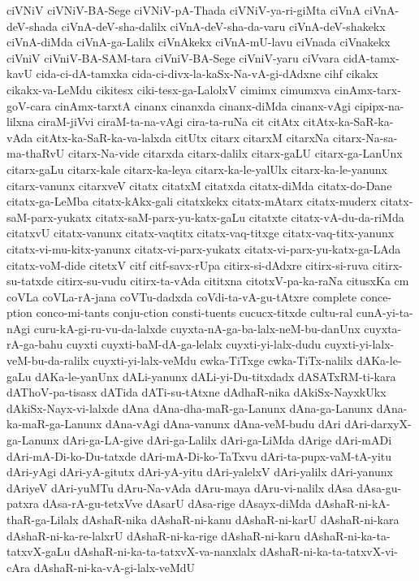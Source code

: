{ciVNiV
ciVNiV-BA-Sege
ciVNiV-pA-Thada
ciVNiV-ya-ri-giMta
ciVnA
ciVnA-deV-shada
ciVnA-deV-sha-dalilx
ciVnA-deV-sha-da-varu
ciVnA-deV-shakekx
ciVnA-diMda
ciVnA-ga-Lalilx
ciVnAkekx
ciVnA-mU-lavu
ciVnada
ciVnakekx
ciVniV
ciVniV-BA-SAM-tara
ciVniV-BA-Sege
ciVniV-yaru
ciVvara
cidA-tamx-kavU
cida-ci-dA-tamxka
cida-ci-divx-la-kaSx-Na-vA-gi-dAdxne
cihf
cikakx
cikakx-va-LeMdu
cikitesx
ciki-tesx-ga-LalolxV
cimimx
cimumxva
cinAmx-tarx-goV-cara
cinAmx-tarxtA
cinanx
cinanxda
cinanx-diMda
cinanx-vAgi
cipipx-na-lilxna
ciraM-jiVvi
ciraM-ta-na-vAgi
cira-ta-ruNa
cit
citAtx
citAtx-ka-SaR-ka-vAda
citAtx-ka-SaR-ka-va-lalxda
citUtx
citarx
citarxM
citarxNa
citarx-Na-sa-ma-thaRvU
citarx-Na-vide
citarxda
citarx-dalilx
citarx-gaLU
citarx-ga-LanUnx
citarx-gaLu
citarx-kale
citarx-ka-leya
citarx-ka-le-yalUlx
citarx-ka-le-yanunx
citarx-vanunx
citarxveV
citatx
citatxM
citatxda
citatx-diMda
citatx-do-Dane
citatx-ga-LeMba
citatx-kAkx-gali
citatxkekx
citatx-mAtarx
citatx-muderx
citatx-saM-parx-yukatx
citatx-saM-parx-yu-katx-gaLu
citatxte
citatx-vA-du-da-riMda
citatxvU
citatx-vanunx
citatx-vaqtitx
citatx-vaq-titxge
citatx-vaq-titx-yanunx
citatx-vi-mu-kitx-yanunx
citatx-vi-parx-yukatx
citatx-vi-parx-yu-katx-ga-LAda
citatx-voM-dide
citetxV
citf
citf-savx-rUpa
citirx-si-dAdxre
citirx-si-ruva
citirx-su-tatxde
citirx-su-vudu
citirx-ta-vAda
cititxna
citotxV-pa-ka-raNa
citusxKa
cm
coVLa
coVLa-rA-jana
coVTu-dadxda
coVdi-ta-vA-gu-tAtxre
complete
conce-ption
conco-mi-tants
conju-ction
consti-tuents
cucucx-titxde
cultu-ral
cunA-yi-ta-nAgi
curu-kA-gi-ru-vu-da-lalxde
cuyxta-nA-ga-ba-lalx-neM-bu-danUnx
cuyxta-rA-ga-bahu
cuyxti
cuyxti-baM-dA-ga-lelalx
cuyxti-yi-lalx-dudu
cuyxti-yi-lalx-veM-bu-da-ralilx
cuyxti-yi-lalx-veMdu
cwka-TiTxge
cwka-TiTx-nalilx
dAKa-le-gaLu
dAKa-le-yanUnx
dALi-yanunx
dALi-yi-Du-titxdadx
dASATxRM-ti-kara
dAThoV-pa-tisasx
dATida
dATi-su-tAtxne
dAdhaR-nika
dAkiSx-NayxkUkx
dAkiSx-Nayx-vi-lalxde
dAna
dAna-dha-maR-ga-Lanunx
dAna-ga-Lanunx
dAna-ka-maR-ga-Lanunx
dAna-vAgi
dAna-vanunx
dAna-veM-budu
dAri
dAri-darxyX-ga-Lanunx
dAri-ga-LA-give
dAri-ga-Lalilx
dAri-ga-LiMda
dArige
dAri-mADi
dAri-mA-Di-ko-Du-tatxde
dAri-mA-Di-ko-TaTxvu
dAri-ta-pupx-vaM-tA-yitu
dAri-yAgi
dAri-yA-gitutx
dAri-yA-yitu
dAri-yalelxV
dAri-yalilx
dAri-yanunx
dAriyeV
dAri-yuMTu
dAru-Na-vAda
dAru-maya
dAru-vi-nalilx
dAsa
dAsa-gu-patxra
dAsa-rA-gu-tetxVve
dAsarU
dAsa-rige
dAsayx-diMda
dAshaR-ni-kA-thaR-ga-Lilalx
dAshaR-nika
dAshaR-ni-kanu
dAshaR-ni-karU
dAshaR-ni-kara
dAshaR-ni-ka-re-lalxrU
dAshaR-ni-ka-rige
dAshaR-ni-karu
dAshaR-ni-ka-ta-tatxvX-gaLu
dAshaR-ni-ka-ta-tatxvX-va-nanxlalx
dAshaR-ni-ka-ta-tatxvX-vi-cAra
dAshaR-ni-ka-vA-gi-lalx-veMdU
}
